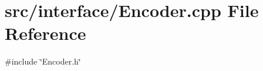 \section{src/interface/\+Encoder.cpp File Reference}
\label{_encoder_8cpp}
{\ttfamily \#include \char`\"{}Encoder.\+h\char`\"{}}\newline
